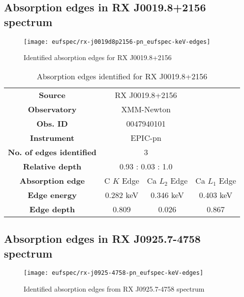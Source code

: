 		\newpage
		\subsection*{Absorption edges in RX J0019.8+2156 spectrum}
			\begin{figure}[h!]
				\centering
				\texttt{[image: eufspec/rx-j0019d8p2156-pn\_eufspec-keV-edges]}
				\caption{Identified absorption edges for RX J0019.8+2156}
				\label{result:absedge-rx-j0019}
			\end{figure}
			
			\renewcommand{\arraystretch}{1.5}
			\begin{table}[!htb]
				\centering
				\caption{Absorption edges identified for RX J0019.8+2156}
				\label{tab:absedge-rx-j0019}
				\begin{tabular}{cccc}
					\hline
					\textbf{Source} & \multicolumn{2}{c}{RX J0019.8+2156} & {} \\
					\textbf{Observatory} & \multicolumn{2}{c}{XMM-Newton}& {} \\
					\textbf{Obs. ID} & \multicolumn{2}{c}{0047940101}& {} \\
					\textbf{Instrument} & \multicolumn{2}{c}{EPIC-pn}& {} \\
					\textbf{No. of edges identified} & \multicolumn{2}{c}{3}& {} \\
					\textbf{Relative depth} & \multicolumn{2}{c}{0.93 : 0.03 : 1.0} & {} \\ \hline
					\textbf{Absorption edge} & {C $K$ Edge} & {Ca $L_2$ Edge} & {Ca $L_1$ Edge} \\
					\textbf{Edge energy} & {0.282 keV} & {0.346 keV} & {0.403 keV} \\
					\textbf{Edge depth} & {0.809} & {0.026} & {0.867} \\ \hline
				\end{tabular}
			\end{table}
			\renewcommand{\arraystretch}{2.2}
		
		
		\subsection*{Absorption edges in RX J0925.7-4758 spectrum}
			\begin{figure}[h!]
				\centering
				\texttt{[image: eufspec/rx-j0925-4758-pn\_eufspec-keV-edges]}
				\caption{Identified absorption edges from RX J0925.7-4758 spectrum}
				\label{result:absedge-rx-j0925}
			\end{figure}
			
